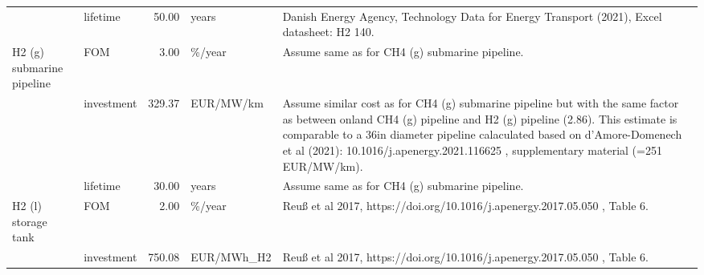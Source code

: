 \begin{longtable}{p{5cm}p{3cm}rp{3cm}p{11cm}}
                      & lifetime &          50.00 &                             years &                                                                                                                                                                                                                                          Danish Energy Agency, Technology Data for Energy Transport (2021), Excel datasheet: H2 140. \\
H2 (g) submarine pipeline & FOM &           3.00 &                            \%/year &                                                                                                                                                                                                                                                                                       Assume same as for CH4 (g) submarine pipeline. \\
                      & investment &         329.37 &                         EUR/MW/km &  Assume similar cost as for CH4 (g) submarine pipeline but with the same factor as between onland CH4 (g) pipeline and H2 (g) pipeline (2.86). This estimate is comparable to a 36in diameter pipeline calaculated based on d’Amore-Domenech et al (2021): 10.1016/j.apenergy.2021.116625 , supplementary material (=251 EUR/MW/km). \\
                      & lifetime &          30.00 &                             years &                                                                                                                                                                                                                                                                                       Assume same as for CH4 (g) submarine pipeline. \\
H2 (l) storage tank & FOM &           2.00 &                            \%/year &                                                                                                                                                                                                                                                           Reuß et al 2017, https://doi.org/10.1016/j.apenergy.2017.05.050 , Table 6. \\
                      & investment &         750.08 &                        EUR/MWh\_H2 &                                                                                                                                                                                                                                                           Reuß et al 2017, https://doi.org/10.1016/j.apenergy.2017.05.050 , Table 6. \\

\end{longtable}
